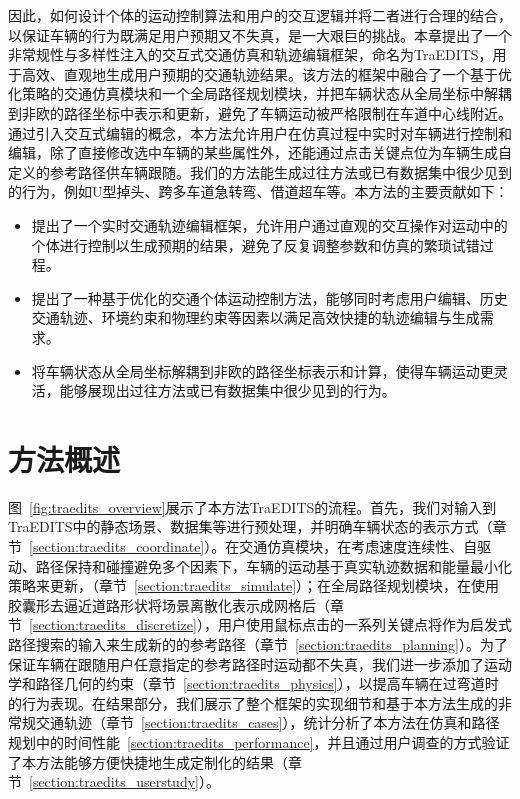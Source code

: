 因此，如何设计个体的运动控制算法和用户的交互逻辑并将二者进行合理的结合，以保证车辆的行为既满足用户预期又不失真，是一大艰巨的挑战。本章提出了一个非常规性与多样性注入的交互式交通仿真和轨迹编辑框架，命名为TraEDITS，用于高效、直观地生成用户预期的交通轨迹结果。该方法的框架中融合了一个基于优化策略的交通仿真模块和一个全局路径规划模块，并把车辆状态从全局坐标中解耦到非欧的路径坐标中表示和更新，避免了车辆运动被严格限制在车道中心线附近。通过引入交互式编辑的概念，本方法允许用户在仿真过程中实时对车辆进行控制和编辑，除了直接修改选中车辆的某些属性外，还能通过点击关键点位为车辆生成自定义的参考路径供车辆跟随。我们的方法能生成过往方法或已有数据集中很少见到的行为，例如U型掉头、跨多车道急转弯、借道超车等。本方法的主要贡献如下：

\begin{itemize}
    \item 提出了一个实时交通轨迹编辑框架，允许用户通过直观的交互操作对运动中的个体进行控制以生成预期的结果，避免了反复调整参数和仿真的繁琐试错过程。
     
    \item 提出了一种基于优化的交通个体运动控制方法，能够同时考虑用户编辑、历史交通轨迹、环境约束和物理约束等因素以满足高效快捷的轨迹编辑与生成需求。

    \item 将车辆状态从全局坐标解耦到非欧的路径坐标表示和计算，使得车辆运动更灵活，能够展现出过往方法或已有数据集中很少见到的行为。
    
\end{itemize}


\section{方法概述}

图~\ref{fig:traedits_overview}展示了本方法TraEDITS的流程。首先，我们对输入到TraEDITS中的静态场景、数据集等进行预处理，并明确车辆状态的表示方式（章节~\ref{section:traedits_coordinate}）。在交通仿真模块，在考虑速度连续性、自驱动、路径保持和碰撞避免多个因素下，车辆的运动基于真实轨迹数据和能量最小化策略来更新，（章节~\ref{section:traedits_simulate}）；在全局路径规划模块，在使用胶囊形去逼近道路形状将场景离散化表示成网格后（章节~\ref{section:traedits_discretize}），用户使用鼠标点击的一系列关键点将作为启发式路径搜索的输入来生成新的的参考路径（章节~\ref{section:traedits_planning}）。为了保证车辆在跟随用户任意指定的参考路径时运动都不失真，我们进一步添加了运动学和路径几何的约束（章节~\ref{section:traedits_physics}），以提高车辆在过弯道时的行为表现。在结果部分，我们展示了整个框架的实现细节和基于本方法生成的非常规交通轨迹（章节~\ref{section:traedits_cases}），统计分析了本方法在仿真和路径规划中的时间性能~\ref{section:traedits_performance}，并且通过用户调查的方式验证了本方法能够方便快捷地生成定制化的结果（章节~\ref{section:traedits_userstudy}）。

